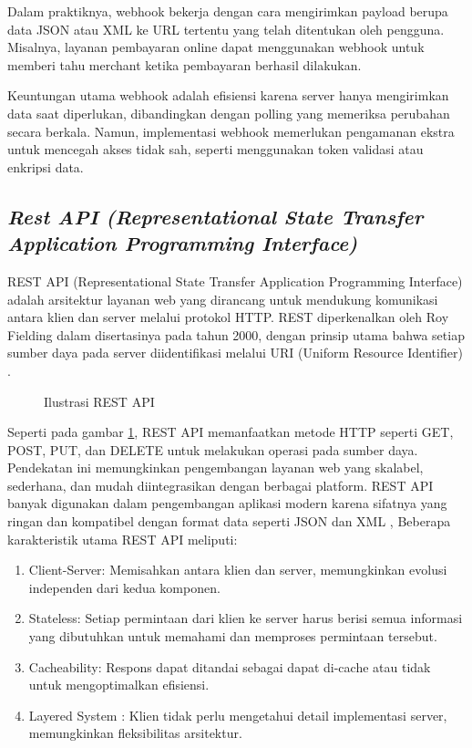 Dalam praktiknya, webhook bekerja dengan cara mengirimkan payload berupa data JSON atau XML ke URL tertentu yang telah ditentukan oleh pengguna. Misalnya, layanan pembayaran online dapat menggunakan webhook untuk memberi tahu merchant ketika pembayaran berhasil dilakukan.

Keuntungan utama webhook adalah efisiensi karena server hanya mengirimkan data saat diperlukan, dibandingkan dengan polling yang memeriksa perubahan secara berkala. Namun, implementasi webhook memerlukan pengamanan ekstra untuk mencegah akses tidak sah, seperti menggunakan token validasi atau enkripsi data.

\subsection{\textit{Rest API (Representational State Transfer Application Programming Interface)}}

REST API (Representational State Transfer Application Programming Interface) adalah arsitektur layanan web yang dirancang untuk mendukung komunikasi antara klien dan server melalui protokol HTTP. REST diperkenalkan oleh Roy Fielding dalam disertasinya pada tahun 2000, dengan prinsip utama bahwa setiap sumber daya pada server diidentifikasi melalui URI (Uniform Resource Identifier) \cite{fielding2000}.

\begin{figure}[H]
    \centering
    \caption{Ilustrasi REST API}
    \label{fig:rest}
\end{figure}

Seperti pada gambar \ref{fig:rest}, REST API memanfaatkan metode HTTP seperti GET, POST, PUT, dan DELETE untuk melakukan operasi pada sumber daya. Pendekatan ini memungkinkan pengembangan layanan web yang skalabel, sederhana, dan mudah diintegrasikan dengan berbagai platform. REST API banyak digunakan dalam pengembangan aplikasi modern karena sifatnya yang ringan dan kompatibel dengan format data seperti JSON dan XML \cite{richardson2007}, Beberapa karakteristik utama REST API meliputi:

\begin{enumerate}
    \item Client-Server: Memisahkan antara klien dan server, memungkinkan evolusi independen dari kedua komponen.
    \item Stateless: Setiap permintaan dari klien ke server harus berisi semua informasi yang dibutuhkan untuk memahami dan memproses permintaan tersebut.
    \item Cacheability: Respons dapat ditandai sebagai dapat di-cache atau tidak untuk mengoptimalkan efisiensi.
    \item Layered System : Klien tidak perlu mengetahui detail implementasi server, memungkinkan fleksibilitas arsitektur.
\end{enumerate}

